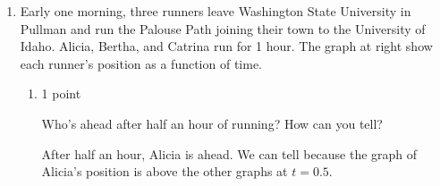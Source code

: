 \documentclass{article}
\begin{document}
\begin{enumerate}
\begin{enumerate}
    \begin{solution}
      $f$ is concave up when $f'$ is increasing, which happens on $(1, 3)$.
    \end{solution}

  \end{enumerate}

  \pspace{\newpage}

\item \label{interpret-trip-palouse}

  \begin{minipage}[t]{\linewidth-2.85in}
    \setlength{\parskip}{8pt}

    Early one morning, three runners leave Washington State University in Pullman and run the Palouse Path joining their town to the University of Idaho. Alicia, Bertha, and Catrina run for 1 hour. The graph at right show each runner's position as a function of time.

    \begin{enumerate}
    \item

      \begin{grading}
        1 point
      \end{grading}

      \begin{problem}
        Who's ahead after half an hour of running? How can you tell? 
      \end{problem}

      \begin{solution}
        After half an hour, Alicia is ahead. We can tell because the graph of Alicia's position
        is above the other graphs at $t=0.5$. 
      \end{solution}
    \end{enumerate}
  \end{minipage}
  \hfill
  \begin{minipage}[t]{2.6in}
    \vspace{-12pt}
  \end{minipage}
  \pspace{0.25in}


\end{enumerate}
\end{document}
